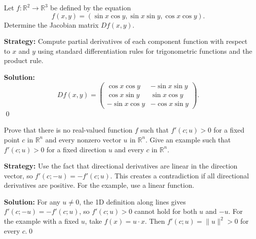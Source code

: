\begin{problembox}
\begin{problemstatement}
Let \( f : \mathbb{R}^2 \to \mathbb{R}^3 \) be defined by the equation
\[f(x, y) = (\sin x \cos y, \sin x \sin y, \cos x \cos y).\]
Determine the Jacobian matrix \( Df(x, y) \).
\end{problemstatement}
\end{problembox}

\noindent\textbf{Strategy:} Compute partial derivatives of each component function with respect to \( x \) and \( y \) using standard differentiation rules for trigonometric functions and the product rule.

\bigskip\noindent\textbf{Solution:}
\[Df(x,y)=\begin{pmatrix}
\cos x\cos y & -\sin x\sin y\\
\cos x\sin y & \sin x\cos y\\
-\sin x\cos y & -\cos x\sin y
\end{pmatrix}.\]\qed


\begin{problembox}
\begin{problemstatement}
Prove that there is no real-valued function \( f \) such that \( f'(c; u) > 0 \) for a fixed point \( c \) in \( \mathbb{R}^n \) and every nonzero vector \( u \) in \( \mathbb{R}^n \). Give an example such that \( f'(c; u) > 0 \) for a fixed direction \( u \) and every \( c \) in \( \mathbb{R}^n \).
\end{problemstatement}
\end{problembox}

\noindent\textbf{Strategy:} Use the fact that directional derivatives are linear in the direction vector, so \( f'(c; -u) = -f'(c; u) \). This creates a contradiction if all directional derivatives are positive. For the example, use a linear function.

\bigskip\noindent\textbf{Solution:}
For any $u\ne0$, the 1D definition along lines gives $f'(c;-u)=-f'(c;u)$, so $f'(c;u)>0$ cannot hold for both $u$ and $-u$. For the example with a fixed $u$, take $f(x)=u\cdot x$. Then $f'(c;u)=\|u\|^2>0$ for every $c$.\qed


